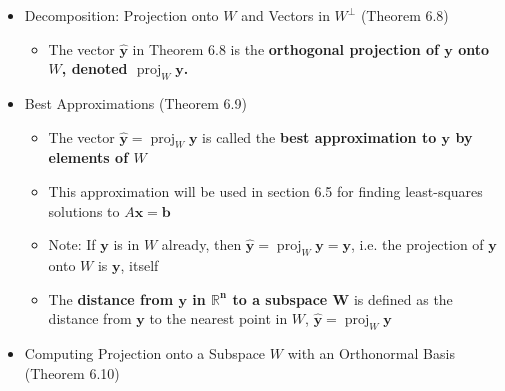 \documentclass[10pt]{book}
\newcommand{\R}{\mathbb{R}}
\newcommand{\vect}[1]{\ensuremath{\boldsymbol{\mathbf{#1}}}}
\DeclareMathOperator{\proj}{proj}
\newcommand{\Axb}{A\vect{x}=\vect{b}}
\newcommand{\yhat}{\hat{\vect{y}}}
\begin{document}
\begin{itemize}
	\item Decomposition: Projection onto $W$ and Vectors in $W^\perp$ (Theorem 6.8)
	\begin{itemize}
		\item The vector $\yhat$ in Theorem 6.8 is the \textbf{orthogonal projection of $\boldsymbol{\vect{y}}$ onto $W$, denoted $\proj_W\vect{y}$.}
	\end{itemize}
	\item Best Approximations (Theorem 6.9)
	\begin{itemize}
		\item The vector $\yhat=\proj_W\vect{y}$ is called the \textbf{best approximation to $\boldsymbol{\vect{y}}$ by elements of $W$}
		\item This approximation will be used in section 6.5 for finding least-squares solutions to $\Axb$
		\item Note: If $\vect{y}$ is in $W$ already, then $\yhat=\proj_W\vect{y}=\vect{y}$, i.e. the projection of $\vect{y}$ onto $W$ is $\vect{y}$, itself
		\item The \textbf{distance from $\boldsymbol{\vect{y}}$ in $\boldsymbol{\R^n}$ to a subspace $\boldsymbol{W}$} is defined as the distance from $\vect{y}$ to the nearest point in $W$, $\yhat=\proj_W\vect{y}$
	\end{itemize}
	\item Computing Projection onto a Subspace $W$ with an Orthonormal Basis (Theorem 6.10)
\end{itemize}
\end{document}
